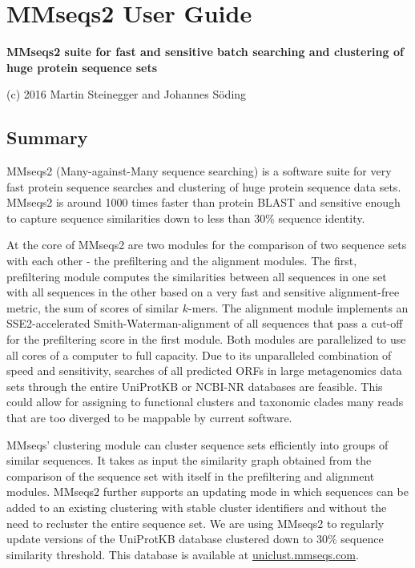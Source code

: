 \documentclass[11pt,a4paper]{scrreprt}
\begin{document}
\chapter*{MMseqs2 User Guide}
\renewcommand*\thesection{\arabic{section}}


\textbf{MMseqs2 suite for fast and sensitive batch searching and clustering of huge protein sequence sets}


(c) 2016 Martin Steinegger and Johannes S\"oding
\section{Summary}


MMseqs2 (Many-against-Many sequence searching) is a software suite for very fast protein sequence searches and clustering of huge protein sequence data sets. MMseqs2 is around 1000 times faster than protein BLAST and sensitive enough to capture sequence similarities down to less than 30\% sequence identity.


At the core of MMseqs2 are two modules for the comparison of two sequence sets with each other - the prefiltering and the alignment modules. The first, prefiltering module computes the similarities between all sequences in one set with all sequences in the other based on a very fast and sensitive alignment-free metric, the sum of scores of similar $k$-mers. The alignment module implements an SSE2-accelerated Smith-Waterman-alignment of all sequences that pass a cut-off for the prefiltering score in the first module. Both modules are parallelized to use all cores of a computer to full capacity. Due to its unparalleled combination of speed and sensitivity, searches of all predicted ORFs in large metagenomics data sets through the entire UniProtKB or NCBI-NR databases are feasible. This could allow for assigning to functional clusters and taxonomic clades many reads that are too diverged to be mappable by current software.


MMseqs' clustering module can cluster sequence sets efficiently into groups of similar sequences. It takes as input the similarity graph obtained from the comparison of the sequence set with itself in the prefiltering and alignment modules. MMseqs2 further supports an updating mode in which sequences can be added to an existing clustering with stable cluster identifiers and without the need to recluster the entire sequence set. We are using MMseqs2 to regularly update versions of the UniProtKB database clustered down to 30\% sequence similarity threshold. This database is available at \href{https://uniclust.mmseqs.com}{uniclust.mmseqs.com}.
\end{document}
